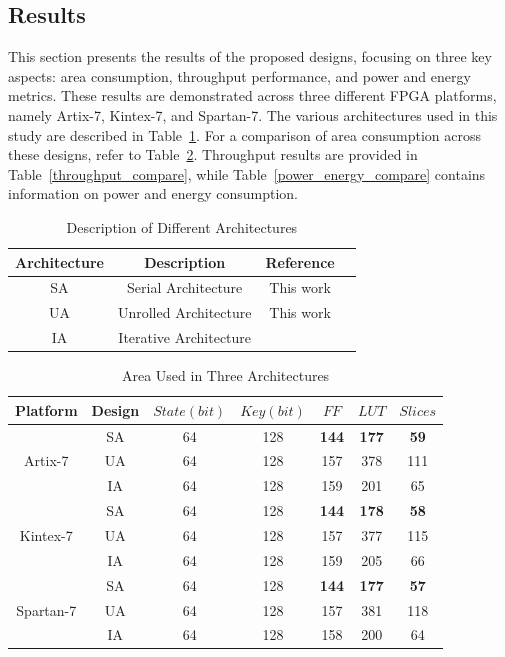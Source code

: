 \documentclass[final,5p,times,twocolumn]{elsarticle}
\begin{document}
\subsection{Results}\label{sec5}



This section presents the results of the proposed designs, focusing on three key aspects: area consumption, throughput performance, and power and energy metrics. These results are demonstrated across three different FPGA platforms, namely Artix-7, Kintex-7, and Spartan-7. The various architectures used in this study are described in Table~\ref{arch_descrip}. For a comparison of area consumption across these designs, refer to Table~\ref{area_compare}. Throughput results are provided in Table~\ref{throughput_compare}, while Table~\ref{power_energy_compare} contains information on power and energy consumption.



\begin{table}[h]
    \centering
    \caption{Description of Different Architectures}\label{arch_descrip}%
    \begin{tabular}{|c|c|c|c|}
        \hline
        Architecture & Description            & Reference          \\
        \hline
        SA           & Serial   Architecture  & This work          \\
        UA           & Unrolled Architecture  & This work          \\
        IA           & Iterative Architecture & \cite{Beierle2019} \\
        \hline
    \end{tabular}
\end{table}


\begin{table}[h]
    \caption{Area Used in Three Architectures}\label{area_compare}%
    \begin{tabular*}{\textwidth}{@{\extracolsep\fill}|c|c|c|c|c|c|c|}
        \hline
        Platform & Design & $State(bit)$ & $Key(bit)$ & $FF$ & $LUT$ & $Slices$ \\
        \hline
        \multirow{3}{*}{Artix-7}  & SA & 64 & 128 & \textbf{144} & \textbf{177} & \textbf{59} \\
        & UA & 64 & 128 & 157 & 378 & 111 \\
        & IA & 64 & 128 & 159 & 201 & 65 \\
        \hline
        \multirow{3}{*}{Kintex-7} & SA & 64 & 128 & \textbf{144} & \textbf{178} & \textbf{58}\\
        & UA & 64 & 128 & 157 & 377 & 115 \\
        & IA & 64 & 128 & 159 & 205 & 66 \\
        \hline
        \multirow{3}{*}{Spartan-7} & SA & 64 & 128 & \textbf{144} & \textbf{177} & \textbf{57}\\
        & UA & 64 & 128 & 157 & 381 & 118 \\
        & IA & 64 & 128 & 158 & 200 & 64 \\
        \hline
    \end{tabular*}
\end{table}
\end{document}
